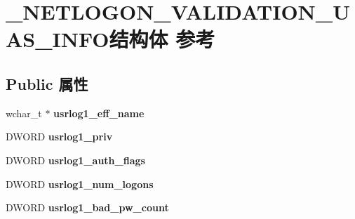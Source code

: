 \hypertarget{struct___n_e_t_l_o_g_o_n___v_a_l_i_d_a_t_i_o_n___u_a_s___i_n_f_o}{}\section{\+\_\+\+N\+E\+T\+L\+O\+G\+O\+N\+\_\+\+V\+A\+L\+I\+D\+A\+T\+I\+O\+N\+\_\+\+U\+A\+S\+\_\+\+I\+N\+F\+O结构体 参考}
\label{struct___n_e_t_l_o_g_o_n___v_a_l_i_d_a_t_i_o_n___u_a_s___i_n_f_o}
\subsection*{Public 属性}
\begin{DoxyCompactItemize}
\item 
\mbox{\label{struct___n_e_t_l_o_g_o_n___v_a_l_i_d_a_t_i_o_n___u_a_s___i_n_f_o_a3e2c2717e102530efcdc2a5168c1eac1}} 
wchar\+\_\+t $\ast$ {\bfseries usrlog1\+\_\+eff\+\_\+name}
\item 
\mbox{\label{struct___n_e_t_l_o_g_o_n___v_a_l_i_d_a_t_i_o_n___u_a_s___i_n_f_o_afa9a1764efa7206b99f425645aacdb79}} 
D\+W\+O\+RD {\bfseries usrlog1\+\_\+priv}
\item 
\mbox{\label{struct___n_e_t_l_o_g_o_n___v_a_l_i_d_a_t_i_o_n___u_a_s___i_n_f_o_add9d672269d05cf235f446dddfa73639}} 
D\+W\+O\+RD {\bfseries usrlog1\+\_\+auth\+\_\+flags}
\item 
\mbox{\label{struct___n_e_t_l_o_g_o_n___v_a_l_i_d_a_t_i_o_n___u_a_s___i_n_f_o_a036d622b989b42c2de9a78adb4a0ba43}} 
D\+W\+O\+RD {\bfseries usrlog1\+\_\+num\+\_\+logons}
\item 
\mbox{\label{struct___n_e_t_l_o_g_o_n___v_a_l_i_d_a_t_i_o_n___u_a_s___i_n_f_o_af04b6c488afffb1faf85a355557b0a72}} 
D\+W\+O\+RD {\bfseries usrlog1\+\_\+bad\+\_\+pw\+\_\+count}
\item 
\mbox{\label{struct___n_e_t_l_o_g_o_n___v_a_l_i_d_a_t_i_o_n___u_a_s___i_n_f_o_ae932861b3b090ffa91c5b9e9567b85af}} 

\end{DoxyCompactItemize}
